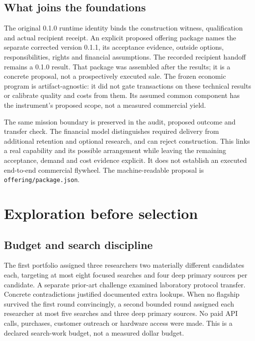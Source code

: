 \documentclass[
  11pt,
]{article}
\let\OriginalSection\section
\renewcommand{\section}{\needspace{5\baselineskip}\OriginalSection}
\let\OriginalSubsection\subsection
\renewcommand{\subsection}{\needspace{6\baselineskip}\OriginalSubsection}
\begin{document}
\hypertarget{what-joins-the-foundations}{%
\subsection{What joins the
foundations}\label{what-joins-the-foundations}}

The original 0.1.0 runtime identity binds the construction witness,
qualification and actual recipient receipt. An explicit proposed
offering package names the separate corrected version 0.1.1, its
acceptance evidence, outside options, responsibilities, rights and
financial assumptions. The recorded recipient handoff remains a 0.1.0
result. That package was assembled after the results; it is a concrete
proposal, not a prospectively executed sale. The frozen economic program
is artifact-agnostic: it did not gate transactions on these technical
results or calibrate quality and costs from them. Its assumed common
component has the instrument's proposed scope, not a measured commercial
yield.

The same mission boundary is preserved in the audit, proposed outcome
and transfer check. The financial model distinguishes required delivery
from additional retention and optional research, and can reject
construction. This links a real capability and its possible arrangement
while leaving the remaining acceptance, demand and cost evidence
explicit. It does not establish an executed end-to-end commercial
flywheel. The machine-readable proposal is
\texttt{offering/\allowbreak{}package.\allowbreak{}json}.

\hypertarget{exploration-before-selection}{%
\section{Exploration before
selection}\label{exploration-before-selection}}

\hypertarget{budget-and-search-discipline}{%
\subsection{Budget and search
discipline}\label{budget-and-search-discipline}}

The first portfolio assigned three researchers two materially different
candidates each, targeting at most eight focused searches and four deep
primary sources per candidate. A separate prior-art challenge examined
laboratory protocol transfer. Concrete contradictions justified
documented extra lookups. When no flagship survived the first round
convincingly, a second bounded round assigned each researcher at most
five searches and three deep primary sources. No paid API calls,
purchases, customer outreach or hardware access were made. This is a
declared search-work budget, not a measured dollar budget.
\end{document}
